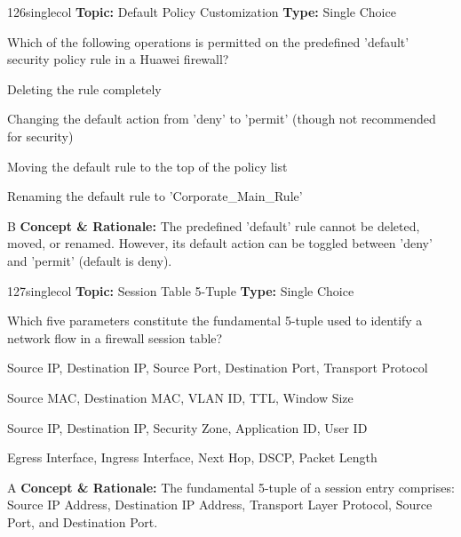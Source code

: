 \begin{qcard}{126}{singlecol}
\textcolor{darkslate!75}{\small\textbf{Topic:} Default Policy Customization \hfill \textbf{Type:} Single Choice}\vspace{0.4em}\par
Which of the following operations is permitted on the predefined 'default' security policy rule in a Huawei firewall?
\begin{qoptions}
\item Deleting the rule completely
\item Changing the default action from 'deny' to 'permit' (though not recommended for security)
\item Moving the default rule to the top of the policy list
\item Renaming the default rule to 'Corporate\_Main\_Rule'
\end{qoptions}
\end{qcard}
\nopagebreak
\begin{explainbox}{B}
\textbf{Concept \& Rationale:} The predefined 'default' rule cannot be deleted, moved, or renamed. However, its default action can be toggled between 'deny' and 'permit' (default is deny).
\end{explainbox}

\begin{qcard}{127}{singlecol}
\textcolor{darkslate!75}{\small\textbf{Topic:} Session Table 5-Tuple \hfill \textbf{Type:} Single Choice}\vspace{0.4em}\par
Which five parameters constitute the fundamental 5-tuple used to identify a network flow in a firewall session table?
\begin{qoptions}
\item Source IP, Destination IP, Source Port, Destination Port, Transport Protocol
\item Source MAC, Destination MAC, VLAN ID, TTL, Window Size
\item Source IP, Destination IP, Security Zone, Application ID, User ID
\item Egress Interface, Ingress Interface, Next Hop, DSCP, Packet Length
\end{qoptions}
\end{qcard}
\nopagebreak
\begin{explainbox}{A}
\textbf{Concept \& Rationale:} The fundamental 5-tuple of a session entry comprises: Source IP Address, Destination IP Address, Transport Layer Protocol, Source Port, and Destination Port.
\end{explainbox}

